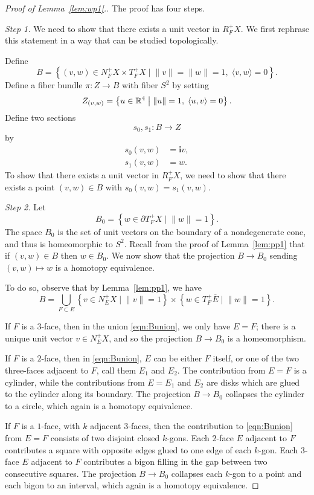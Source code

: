 \begin{proof}[Proof of Lemma~\ref{lem:wp1}.] The proof has four steps.

{\em Step 1.\/} We need to show that there exists a unit vector in $R_F^+X$. We first rephrase this statement in a way that can be studied topologically.

Define
\[
B = \left\{(v,w)\in N_F^+X\times T_F^+X \;\big|\; \|v\|=\|w\|=1,\; \langle v,w\rangle = 0\right\}.
\]
Define a fiber bundle $\pi:Z\to B$ with fiber $S^2$ by setting
\[
Z_{(v,w)}=\left\{u\in{\mathbb R}^4 \;\big|\; \|u\|=1, \; \langle u,v\rangle = 0 \right\}.
\]
Define two sections
\[
s_0,s_1: B \longrightarrow Z
\]
by
\[
\begin{split}
s_0(v,w) &= {\mathbf i}v,\\
s_1(v,w) &= w.
\end{split}
\]
To show that there exists a unit vector in $R_F^+X$, we need to show that there exists a point $(v,w)\in B$ with $s_0(v,w) = s_1(v,w)$.

{\em Step 2.\/} 
Let
\[
B_0 = \left\{w\in\partial T_F^+X \; \big| \; \|w\|=1\right\}.
\]
The space $B_0$ is the set of unit vectors on the boundary of a nondegenerate cone, and thus is homeomorphic to $S^2$. Recall from the proof of Lemma~\ref{lem:pp1} that if $(v,w)\in B$ then $w\in B_0$. We now show that the projection $B\to B_0$ sending $(v,w)\mapsto w$ is a homotopy equivalence.

To do so, observe that by Lemma~\ref{lem:pp1}, we have
\begin{equation}
\label{eqn:Bunion}
B = \bigcup_{F\subset E} \left\{v\in N_E^+X\;\big|\; \|v\|=1\right\} \times \left\{w\in T_F^+\overline{E} \;\big|\; \|w\|=1\right\}.
\end{equation}

If $F$ is a $3$-face, then in the union \eqref{eqn:Bunion}, we only have $E=F$; there is a unique unit vector $v\in N_E^+X$, and so the projection $B\to B_0$ is a homeomorphism.

If $F$ is a $2$-face, then in \eqref{eqn:Bunion}, $E$ can be either $F$ itself, or one of the two three-faces adjacent to $F$, call them $E_1$ and $E_2$. The contribution from $E=F$ is a cylinder, while the contributions from $E=E_1$ and $E_2$ are disks which are glued to the cylinder along its boundary. The projection $B\to B_0$ collapses the cylinder to a circle, which again is a homotopy equivalence.

If $F$ is a $1$-face, with $k$ adjacent $3$-faces, then the contribution to \eqref{eqn:Bunion} from $E=F$ consists of two disjoint closed $k$-gons. Each $2$-face $E$ adjacent to $F$ contributes a square with opposite edges glued to one edge of each $k$-gon. Each $3$-face $E$ adjacent to $F$ contributes a bigon filling in the gap between two consecutive squares. The projection $B\to B_0$ collapses each $k$-gon to a point and each bigon to an interval, which again is a homotopy equivalence.


\end{proof}
